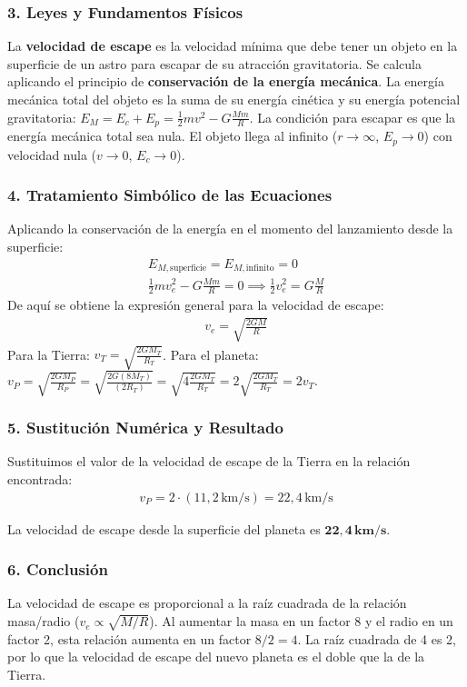 \subsubsection*{3. Leyes y Fundamentos Físicos}
La \textbf{velocidad de escape} es la velocidad mínima que debe tener un objeto en la superficie de un astro para escapar de su atracción gravitatoria. Se calcula aplicando el principio de \textbf{conservación de la energía mecánica}.
La energía mecánica total del objeto es la suma de su energía cinética y su energía potencial gravitatoria: $E_M = E_c + E_p = \frac{1}{2}mv^2 - G\frac{Mm}{R}$.
La condición para escapar es que la energía mecánica total sea nula. El objeto llega al infinito ($r\to\infty$, $E_p \to 0$) con velocidad nula ($v \to 0$, $E_c \to 0$).

\subsubsection*{4. Tratamiento Simbólico de las Ecuaciones}
Aplicando la conservación de la energía en el momento del lanzamiento desde la superficie:
\begin{gather}
    E_{M, \text{superficie}} = E_{M, \text{infinito}} = 0 \\
    \frac{1}{2}mv_e^2 - G\frac{Mm}{R} = 0 \implies \frac{1}{2}v_e^2 = G\frac{M}{R}
\end{gather}
De aquí se obtiene la expresión general para la velocidad de escape:
\begin{gather}
    v_e = \sqrt{\frac{2GM}{R}}
\end{gather}
Para la Tierra: $v_T = \sqrt{\frac{2GM_T}{R_T}}$.
Para el planeta: $v_P = \sqrt{\frac{2GM_P}{R_P}} = \sqrt{\frac{2G(8M_T)}{(2R_T)}} = \sqrt{4 \frac{2GM_T}{R_T}} = 2 \sqrt{\frac{2GM_T}{R_T}} = 2v_T$.

\subsubsection*{5. Sustitución Numérica y Resultado}
Sustituimos el valor de la velocidad de escape de la Tierra en la relación encontrada:
\begin{gather}
    v_P = 2 \cdot (11,2\,\text{km/s}) = 22,4\,\text{km/s}
\end{gather}
\begin{cajaresultado}
La velocidad de escape desde la superficie del planeta es $\boldsymbol{22,4\,\textbf{km/s}}$.
\end{cajaresultado}

\subsubsection*{6. Conclusión}
\begin{cajaconclusion}
La velocidad de escape es proporcional a la raíz cuadrada de la relación masa/radio ($v_e \propto \sqrt{M/R}$). Al aumentar la masa en un factor 8 y el radio en un factor 2, esta relación aumenta en un factor $8/2 = 4$. La raíz cuadrada de 4 es 2, por lo que la velocidad de escape del nuevo planeta es el doble que la de la Tierra.
\end{cajaconclusion}
\newpage

